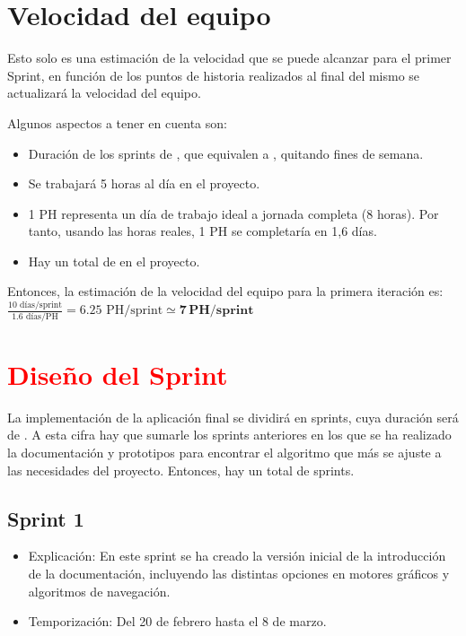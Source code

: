 \newpage

\section{Velocidad del equipo}

Esto solo es una estimación de la velocidad que se puede alcanzar para el primer Sprint, en función de los puntos de historia realizados al final del mismo se actualizará la velocidad del equipo.

\bigskip

Algunos aspectos a tener en cuenta son:

\begin{itemize}
    \item Duración de los sprints de \sprintLength, que equivalen a \actualSprintLength, quitando fines de semana.
    \item Se trabajará 5 horas al día en el proyecto.
    \item 1 PH representa un día de trabajo ideal a jornada completa (8 horas). Por tanto, usando las horas reales, 1 PH se completaría en 1,6 días.
    \item Hay un total de \projectph en el proyecto.
\end{itemize}

\bigskip

Entonces, la estimación de la velocidad del equipo para la primera iteración es: $\frac{10 \text{ días/sprint}}{1.6 \text{ días/PH}} = 6.25 \text{ PH/sprint} \simeq \mathbf{7\,PH/sprint}$

\section{\textcolor{red}{Diseño del Sprint}}


La implementación de la aplicación final se dividirá en \sprintNro sprints, cuya duración será de \sprintLength. A esta cifra hay que sumarle los \docSprints sprints anteriores en los que se ha realizado la documentación y prototipos para encontrar el algoritmo que más se ajuste a las necesidades del proyecto. Entonces, hay un total de \totalSprints sprints.

\subsection{Sprint 1}
\begin{itemize}
    \item Explicación: En este sprint se ha creado la versión inicial de la introducción de la documentación, incluyendo las distintas opciones en motores gráficos y algoritmos de navegación.

    \item Temporización: Del 20 de febrero hasta el 8 de marzo.
\end{itemize}

